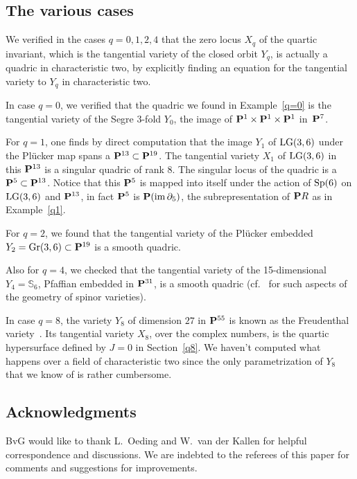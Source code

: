 \documentclass[10pt,a4paper]{amsart}
\newcommand{\PP}{{\bf P}}
\newcommand{\bS}{{\mathbb S}}
\newcommand{\im}{\operatorname{im}}
\numberwithin{equation}{section}
\begin{document}
\subsection{The various cases} \label{varcas}
We verified in the cases $q=0,1,2,4$ that the zero locus $X_q$ of the quartic invariant, which is the tangential variety of the closed orbit $Y_q$, is actually a quadric in characteristic two, by explicitly finding an equation for the tangential variety to $Y_q$ in characteristic two.

In case $q=0$, we verified that the quadric we found in Example~\ref{q=0} is the tangential variety of the Segre 3-fold $Y_0$, the image of $\PP^1\times\PP^1\times\PP^1$ in~$\PP^7$.

For $q=1$, one finds by direct computation that the image $Y_1$ of ${\rm LG}(3,6)$ under the Pl\"ucker map spans a $\PP^{13}\subset\PP^{19}$. The tangential variety $X_1$ of ${\rm LG}(3,6)$ in this $\PP^{13}$ is a singular quadric of rank $8$. The singular locus of the quadric is a $\PP^5\subset\PP^{13}$. Notice that this $\PP^5$ is mapped into itself under the action of ${\rm Sp}(6)$ on ${\rm LG}(3,6)$ and $\PP^{13}$, in fact $\PP^5$ is $\PP(\im\partial_5)$, the subrepresentation of $\PP R$ as in Example~\ref{q1}.

For $q=2$, we found that the tangential variety of the Pl\"ucker embedded $Y_2={\rm Gr}(3,6)\subset\PP^{19}$ is a smooth quadric.

Also for $q=4$, we checked that the tangential variety of the 15-dimensional $Y_4=\bS_6$, Pfaffian embedded in $\PP^{31}$, is a smooth quadric (cf.~\cite{M} for such aspects of the geometry of spinor varieties).

In case $q=8$, the variety $Y_8$ of dimension $27$ in $\PP^{55}$ is known as the Freudenthal variety~\cite{MM}. Its tangential variety $X_8$, over the complex numbers, is the quartic hypersurface defined by $J=0$ in Section~\ref{q8}. We haven't computed what happens over a field of characteristic two since the only parametrization of $Y_8$ that we know of is rather cumbersome.

\subsection*{Acknowledgments}
BvG would like to thank L.~Oeding and W.~van der Kallen for helpful correspondence and discussions. We are indebted to the referees of this paper for comments and suggestions
for improvements.

\end{document}
